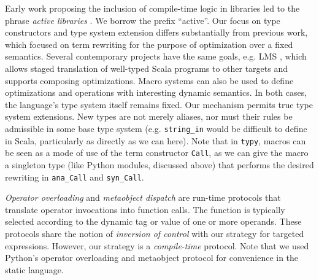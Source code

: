 \documentclass[preprint,10pt]{sigplanconf}
\newcommand{\lip}[1]{\lstinline[language=Python,basicstyle=\ttfamily\small,deletendkeywords={tuple,buffer,map}]{#1}}
\begin{document}
Early work proposing the inclusion of compile-time logic in libraries led to the phrase {\it active libraries} \cite{activelibraries}. We borrow the prefix ``active''. Our focus on type constructors and type system extension differs substantially from previous work, which focused on term rewriting for the purpose of optimization over a fixed semantics. Several contemporary projects have the same goals, e.g. LMS \cite{Rompf:2012:LMS}, which allows staged translation of well-typed Scala programs to other targets and supports composing optimizations. Macro systems can also be used to define optimizations and operations with interesting dynamic semantics. In both cases, the language's type system itself remains fixed. Our mechanism permits true type system extensions. New types are not merely aliases, nor must their rules be admissible in some base type system (e.g. \lip{string_in} would be difficult to define in Scala, particularly as directly as we can here). Note that in \texttt{typy}, macros can be seen as a mode of use of the term constructor \verb|Call|, as we can give the macro a singleton type (like Python modules, discussed above) that performs the desired rewriting in \verb|ana_Call| and \verb|syn_Call|.


{\it Operator overloading} \cite{vanWijngaarden:Mailloux:Peck:Koster:Sintzoff:Lindsey:Meertens:Fisker:acta:1975} and {\it metaobject dispatch} \cite{Kiczales91} are run-time protocols that translate operator invocations into function calls. The function is typically selected according to the dynamic tag or value of one or more operands. These protocols share the notion of {\it inversion of control} with our strategy for targeted expressions. However, our strategy is a {\it compile-time} protocol. Note that we used Python's operator overloading and metaobject protocol for convenience in the static language. %
\end{document}
